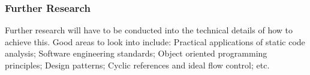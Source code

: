 \subsubsection{Further Research}
Further research will have to be conducted into the technical details of how to achieve this. Good areas to look into include: Practical applications of static code analysis; Software engineering standards; Object oriented programming principles; Design patterns; Cyclic references and ideal flow control; etc.